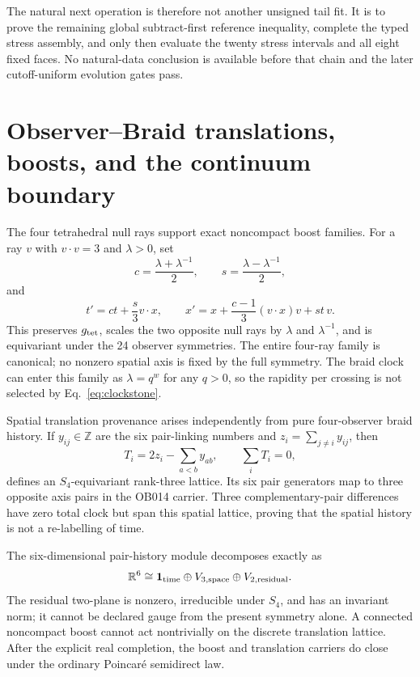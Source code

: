 \documentclass[11pt]{article}
\theoremstyle{definition}
\theoremstyle{remark}
\begin{document}
The natural next operation is therefore not another unsigned tail fit. It is to prove the remaining global subtract-first reference inequality, complete the typed stress assembly, and only then evaluate the twenty stress intervals and all eight fixed faces. No natural-data conclusion is available before that chain and the later cutoff-uniform evolution gates pass.

\section{Observer--Braid translations, boosts, and the continuum boundary}

The four tetrahedral null rays support exact noncompact boost families. For a ray $v$ with $v\cdot v=3$ and $\lambda>0$, set
\begin{equation}
 c=\frac{\lambda+\lambda^{-1}}2,\qquad s=\frac{\lambda-\lambda^{-1}}2,
\end{equation}
and
\begin{equation}
 t'=ct+\frac{s}{3}v\cdot x,
 \qquad x'=x+\frac{c-1}{3}(v\cdot x)v+st\,v.
\end{equation}
This preserves $g_{\rm tet}$, scales the two opposite null rays by $\lambda$ and $\lambda^{-1}$, and is equivariant under the 24 observer symmetries. The entire four-ray family is canonical; no nonzero spatial axis is fixed by the full symmetry. The braid clock can enter this family as $\lambda=q^w$ for any $q>0$, so the rapidity per crossing is not selected by Eq.~\eqref{eq:clockstone}.

Spatial translation provenance arises independently from pure four-observer braid history. If $y_{ij}\in\mathbb Z$ are the six pair-linking numbers and $z_i=\sum_{j\ne i}y_{ij}$, then
\begin{equation}
 T_i=2z_i-\sum_{a<b}y_{ab},\qquad \sum_iT_i=0,
\end{equation}
defines an $S_4$-equivariant rank-three lattice. Its six pair generators map to three opposite axis pairs in the OB014 carrier. Three complementary-pair differences have zero total clock but span this spatial lattice, proving that the spatial history is not a re-labelling of time.

The six-dimensional pair-history module decomposes exactly as
\begin{equation}\label{eq:132}
 \mathbb R^6\cong \mathbf1_{\rm time}\oplus V_{3,\rm space}\oplus V_{2,\rm residual}.
\end{equation}
The residual two-plane is nonzero, irreducible under $S_4$, and has an invariant norm; it cannot be declared gauge from the present symmetry alone. A connected noncompact boost cannot act nontrivially on the discrete translation lattice. After the explicit real completion, the boost and translation carriers do close under the ordinary Poincar\'e semidirect law.
\end{document}
